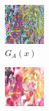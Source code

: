 \documentclass[twocolumn,11pt]{ctexart}
\begin{document}
\begin{figure}[htb]
\begin{subfigure}[b]{0.23\linewidth}
        \includegraphics[width=\linewidth]{exp5_epoch140_fake_B.png}
        \caption{$G_A(x)$}
      \end{subfigure}
      \begin{subfigure}[b]{0.23\linewidth}
        \includegraphics[width=\linewidth]{exp5_epoch140_rec_A.png}

\end{subfigure}
\end{figure}
\end{document}
